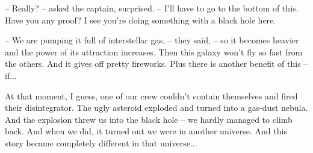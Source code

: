 \documentclass[ebook,twoside,final,openright]{memoir}
\begin{document}
– Really? – asked the captain, surprised. – I’ll have to go to the bottom of this. Have you any proof? I see you're doing something with a black hole here.\par
– We are pumping it full of interstellar gas, – they said, – so it becomes heavier and the power of its attraction increases. Then this galaxy won’t fly so fast from the others. And it gives off pretty fireworks. Plus there is another benefit of this – if...\par
At that moment, I guess, one of our crew couldn’t contain themselves and fired their disintegrator. The ugly asteroid exploded and turned into a gas-dust nebula. And the explosion threw us into the black hole – we hardly managed to climb back. And when we did, it turned out we were in another universe. And this story became completely different in that universe...
\end{document}
